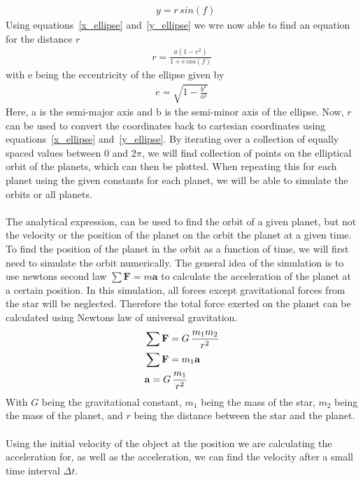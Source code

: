 \documentclass[reprint,english,notitlepage]{revtex4-2}
\begin{document}
\begin{align}
	&y = r\,sin(f) \label{y_ellipse}
\end{align}
Using equations~\ref{x_ellipse} and~\ref{y_ellipse} we wre now able to find an equation for the distance $r$
\begin{align*}
    r = \frac{a(1-e^2)}{1 + e\,cos(f)}
\end{align*}
with e being the eccentricity of the ellipse given by
\begin{align*}
    e = \sqrt{1-\frac{b^2}{a^2}}
\end{align*}
Here, a is the semi-major axis and b is the semi-minor axis of the ellipse.
Now, $r$ can be used to convert the coordinates back to cartesian coordinates using equations~\ref{x_ellipse} and~\ref{y_ellipse}.
By iterating over a collection of equally spaced values between $0$ and $2\pi$, we will find collection of points on the elliptical orbit of the planets, which can then be plotted.
When repeating this for each planet using the given constants for each planet, we will be able to simulate the orbits or all planets.\\\\
The analytical expression, can be used to find the orbit of a given planet, but not the velocity or the position of the planet on the orbit the planet at a given time.
To find the position of the planet in the orbit as a function of time, we will first need to simulate the orbit numerically.
The general idea of the simulation is to use newtons second law $\sum\textbf{F} = m\textbf{a}$ to calculate the acceleration of the planet at a certain position.
In this simulation, all forces except gravitational forces from the star will be neglected.
Therefore the total force exerted on the planet can be calculated using Newtons law of universal gravitation.
\begin{align*}
    &\sum\textbf{F} = G\,\frac{m_1 m_2}{r^2} \label{Newton_Grav_law}\\
	&\sum\textbf{F} = m_1 \textbf{a}\\
	&\bold{a} = G\,\frac{m_1}{r^2}
\end{align*}
With $G$ being the gravitational constant, $m_1$ being the mass of the star, $m_2$ being the mass of the planet, and $r$ being the distance between the star and the planet.\\\\
Using the initial velocity of the object at the position we are calculating the acceleration for, as well as the acceleration, we can find the velocity after a small time interval $\Delta t$.
\end{document}
